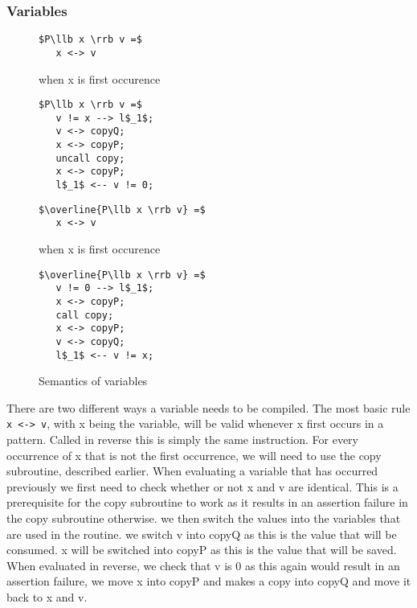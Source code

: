 \documentclass[a4paper]{article}
\begin{document}
\subsubsection{Variables}
\label{sec:org5ff9d66}
\begin{figure}[!htb]
\begin{minipage}{0.4\textwidth}
\begin{lstlisting}
$P\llb x \rrb v =$
   x <-> v
\end{lstlisting}
when x is first occurence
\begin{lstlisting}
$P\llb x \rrb v =$
   v != x --> l$_1$;
   v <-> copyQ;
   x <-> copyP;
   uncall copy;
   x <-> copyP;
   l$_1$ <-- v != 0;
\end{lstlisting}
\end{minipage}
\qquad
\begin{minipage}{0.4\textwidth}
\begin{lstlisting}
$\overline{P\llb x \rrb v} =$
   x <-> v
\end{lstlisting}
when x is first occurence
\begin{lstlisting}
$\overline{P\llb x \rrb v} =$
   v != 0 --> l$_1$;
   x <-> copyP;
   call copy;
   x <-> copyP;
   v <-> copyQ;
   l$_1$ <-- v != x;
\end{lstlisting}
\end{minipage}

\caption{Semantics of variables}
\label{variables}
\end{figure}
There are two different ways a variable needs to be compiled. The most basic rule \texttt{x <-> v}, with x being the variable, will be valid whenever x first occurs in a pattern. Called in reverse this is simply the same instruction. For every occurrence of x that is not the first occurrence, we will need to use the copy subroutine, described earlier. When evaluating a variable that has occurred previously we first need to check whether or not x and v are identical. This is a prerequisite for the copy subroutine to work as it results in an assertion failure in the copy subroutine otherwise. we then switch the values into the variables that are used in the routine. we switch v into copyQ as this is the value that will be consumed. x will be switched into copyP as this is the value that will be saved. When evaluated in reverse, we check that v is 0 as this again would result in an assertion failure, we move x into copyP and makes a copy into copyQ and move it back to x and v.
\end{document}
